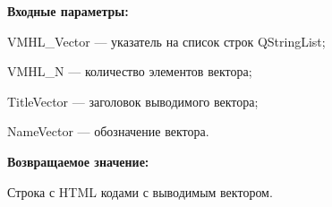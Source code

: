 \textbf{Входные параметры:}
 
VMHL\_Vector --- указатель на список строк QStringList;
 
    VMHL\_N --- количество элементов вектора;
 
    TitleVector --- заголовок выводимого вектора;
 
    NameVector --- обозначение вектора.

\textbf{Возвращаемое значение:}

Строка с HTML кодами с выводимым вектором.